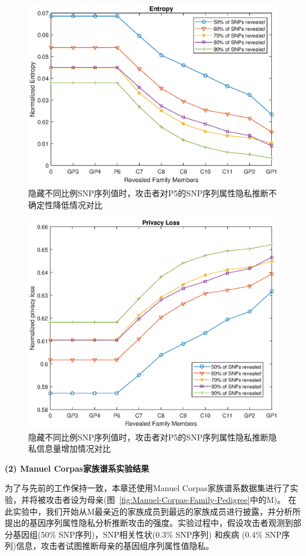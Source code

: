 \begin{figure}[htbp]
	\centering
	\includegraphics[width=0.8\linewidth]{./figures/P5entropy3.eps}
	\centering
	\caption{隐藏不同比例SNP序列值时，攻击者对P5的SNP序列属性隐私推断不确定性降低情况对比}\label{fig:P5entropy3}
\end{figure}

\begin{figure}[htbp]
	\centering
	\includegraphics[width=0.8\linewidth]{./figures/P5privacyloss3.eps}
	\centering
	\caption{隐藏不同比例SNP序列值时，攻击者对P5的SNP序列属性隐私推断隐私信息量增加情况对比}\label{fig:P5privacyloss3}
\end{figure}


\textbf{(2) Manuel Corpas家族谱系实验结果}

为了与先前的工作保持一致，本章还使用Manuel Corpas家族谱系数据集进行了实验，并将被攻击者设为母亲(图~\ref{fig:Manuel-Corpas-Family-Pedigree}中的M)。 在此实验中，我们开始从M最亲近的家族成员到最远的家族成员进行披露，并分析所提出的基因序列属性隐私分析推断攻击的强度。实验过程中，假设攻击者观测到部分基因组(50\% SNP序列)，SNP相关性状(0.3\% SNP序列) 和疾病 (0.4\% SNP序列)信息，攻击者试图推断母亲的基因组序列属性值隐私。

